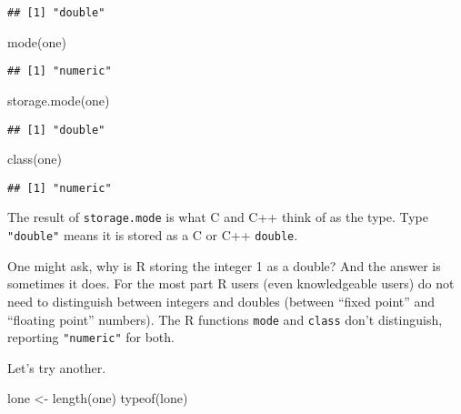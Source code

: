\documentclass[
]{article}
\newenvironment{Shaded}{\begin{snugshade}}{\end{snugshade}}
\newcommand{\FunctionTok}[1]{\textcolor[rgb]{0.00,0.00,0.00}{#1}}
\newcommand{\NormalTok}[1]{#1}
\newcommand{\OtherTok}[1]{\textcolor[rgb]{0.56,0.35,0.01}{#1}}
\begin{document}
\begin{verbatim}
## [1] "double"
\end{verbatim}

\begin{Shaded}
\begin{Highlighting}[]
\FunctionTok{mode}\NormalTok{(one)}
\end{Highlighting}
\end{Shaded}

\begin{verbatim}
## [1] "numeric"
\end{verbatim}

\begin{Shaded}
\begin{Highlighting}[]
\FunctionTok{storage.mode}\NormalTok{(one)}
\end{Highlighting}
\end{Shaded}

\begin{verbatim}
## [1] "double"
\end{verbatim}

\begin{Shaded}
\begin{Highlighting}[]
\FunctionTok{class}\NormalTok{(one)}
\end{Highlighting}
\end{Shaded}

\begin{verbatim}
## [1] "numeric"
\end{verbatim}

The result of \texttt{storage.mode} is what C and C++ think of as the
type. Type \texttt{"double"} means it is stored as a C or C++
\texttt{double}.

One might ask, why is R storing the integer 1 as a double? And the
answer is sometimes it does. For the most part R users (even
knowledgeable users) do not need to distinguish between integers and
doubles (between ``fixed point'' and ``floating point'' numbers). The R
functions \texttt{mode} and \texttt{class} don't distinguish, reporting
\texttt{"numeric"} for both.

\pagebreak[3]

Let's try another.

\begin{Shaded}
\begin{Highlighting}[]
\NormalTok{lone }\OtherTok{\textless{}{-}} \FunctionTok{length}\NormalTok{(one)}
\FunctionTok{typeof}\NormalTok{(lone)}
\end{Highlighting}
\end{Shaded}
\end{document}
